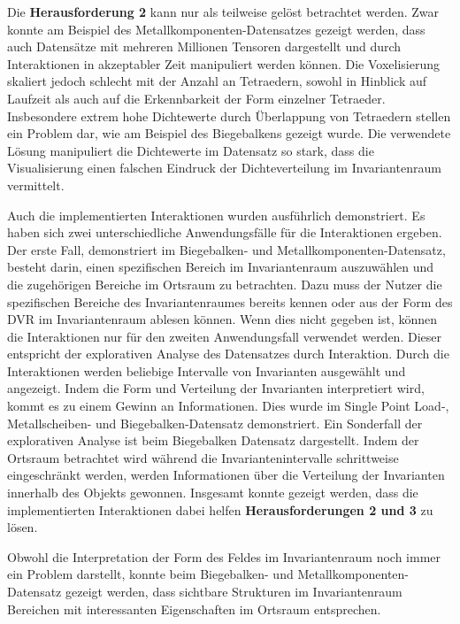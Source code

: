 \documentclass[a4paper,fontsize=12pt,toc=bib,parskip=half,ngerman]{scrartcl}
\begin{document}
Die \textbf{Herausforderung 2} kann nur als teilweise gel\"ost betrachtet werden. Zwar konnte am Beispiel des Metallkomponenten-Datensatzes gezeigt werden, dass auch Datens\"atze mit mehreren Millionen Tensoren dargestellt und durch Interaktionen in akzeptabler Zeit manipuliert werden k\"onnen. Die Voxelisierung skaliert jedoch schlecht mit der Anzahl an Tetraedern, sowohl in Hinblick auf Laufzeit als auch auf die Erkennbarkeit der Form einzelner Tetraeder. Insbesondere extrem hohe Dichtewerte durch \"Uberlappung von Tetraedern stellen ein Problem dar, wie am Beispiel des Biegebalkens gezeigt wurde. Die verwendete L\"osung manipuliert die Dichtewerte im Datensatz so stark, dass die Visualisierung einen falschen Eindruck der Dichteverteilung im Invariantenraum vermittelt.

Auch die implementierten Interaktionen wurden ausf\"uhrlich demonstriert. Es haben sich zwei unterschiedliche Anwendungsf\"alle f\"ur die Interaktionen ergeben. Der erste Fall, demonstriert im Biegebalken- und Metallkomponenten-Datensatz, besteht darin, einen spezifischen Bereich im Invariantenraum auszuw\"ahlen und die zugeh\"origen Bereiche im Ortsraum zu betrachten. Dazu muss der Nutzer die spezifischen Bereiche des Invariantenraumes bereits kennen oder aus der Form des DVR im Invariantenraum ablesen k\"onnen. Wenn dies nicht gegeben ist, k\"onnen die Interaktionen nur f\"ur den zweiten Anwendungsfall verwendet werden. Dieser entspricht der explorativen Analyse des Datensatzes durch Interaktion. Durch die Interaktionen werden beliebige Intervalle von Invarianten ausgew\"ahlt und angezeigt. Indem die Form und Verteilung der Invarianten interpretiert wird, kommt es zu einem Gewinn an Informationen. Dies wurde im Single Point Load-, Metallscheiben- und Biegebalken-Datensatz demonstriert. Ein Sonderfall der explorativen Analyse ist beim Biegebalken Datensatz dargestellt. Indem der Ortsraum betrachtet wird w\"ahrend die Invariantenintervalle schrittweise eingeschr\"ankt werden, werden Informationen \"uber die Verteilung der Invarianten innerhalb des Objekts gewonnen. Insgesamt konnte gezeigt werden, dass die implementierten Interaktionen dabei helfen \textbf{Herausforderungen 2 und 3} zu l\"osen.

Obwohl die Interpretation der Form des Feldes im Invariantenraum noch immer ein Problem darstellt, konnte beim Biegebalken- und Metallkomponenten-Datensatz gezeigt werden, dass sichtbare Strukturen im Invariantenraum Bereichen mit interessanten Eigenschaften im Ortsraum entsprechen.
\end{document}
